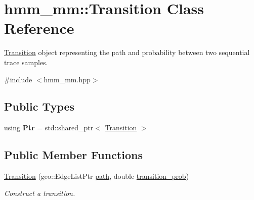 \hypertarget{classhmm__mm_1_1Transition}{}\section{hmm\+\_\+mm\+:\+:Transition Class Reference}
\label{classhmm__mm_1_1Transition}


\hyperlink{classhmm__mm_1_1Transition}{Transition} object representing the path and probability between two sequential trace samples.  




{\ttfamily \#include $<$hmm\+\_\+mm.\+hpp$>$}

\subsection*{Public Types}
\begin{DoxyCompactItemize}
\item 
using {\bfseries Ptr} = std\+::shared\+\_\+ptr$<$ \hyperlink{classhmm__mm_1_1Transition}{Transition} $>$\hypertarget{classhmm__mm_1_1Transition_a9e3b6937064eaf75c47aa10d02c3fa90}{}\label{classhmm__mm_1_1Transition_a9e3b6937064eaf75c47aa10d02c3fa90}

\end{DoxyCompactItemize}
\subsection*{Public Member Functions}
\begin{DoxyCompactItemize}
\item 
\hyperlink{classhmm__mm_1_1Transition_a2f976fd67d2085dde8b8d3a1262f25e2}{Transition} (geo\+::\+Edge\+List\+Ptr \hyperlink{classhmm__mm_1_1Transition_a8548802ff270c39e28540a2f9f7689c4}{path}, double \hyperlink{classhmm__mm_1_1Transition_a5e7e1855dd8a26b8891e52317f094b7e}{transition\+\_\+prob})
\begin{DoxyCompactList}\small\item\em Construct a transition. \end{DoxyCompactList}\end{DoxyCompactItemize}
